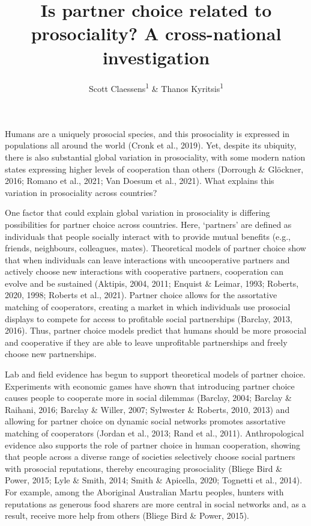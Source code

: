 \documentclass[
  man,floatsintext]{apa6}
\title{Is partner choice related to prosociality? A cross-national investigation}
\author{Scott Claessens\textsuperscript{1} \& Thanos Kyritsis\textsuperscript{1}}
\date{}
\affiliation{\vspace{0.5cm}\textsuperscript{1} School of Psychology, University of Auckland, Auckland, New Zealand}
\begin{document}
\maketitle

Humans are a uniquely prosocial species, and this prosociality is expressed in populations all around the world (Cronk et al., 2019). Yet, despite its ubiquity, there is also substantial global variation in prosociality, with some modern nation states expressing higher levels of cooperation than others (Dorrough \& Glöckner, 2016; Romano et al., 2021; Van Doesum et al., 2021). What explains this variation in prosociality across countries?

One factor that could explain global variation in prosociality is differing possibilities for partner choice across countries. Here, `partners' are defined as individuals that people socially interact with to provide mutual benefits (e.g., friends, neighbours, colleagues, mates). Theoretical models of partner choice show that when individuals can leave interactions with uncooperative partners and actively choose new interactions with cooperative partners, cooperation can evolve and be sustained (Aktipis, 2004, 2011; Enquist \& Leimar, 1993; Roberts, 2020, 1998; Roberts et al., 2021). Partner choice allows for the assortative matching of cooperators, creating a market in which individuals use prosocial displays to compete for access to profitable social partnerships (Barclay, 2013, 2016). Thus, partner choice models predict that humans should be more prosocial and cooperative if they are able to leave unprofitable partnerships and freely choose new partnerships.

Lab and field evidence has begun to support theoretical models of partner choice. Experiments with economic games have shown that introducing partner choice causes people to cooperate more in social dilemmas (Barclay, 2004; Barclay \& Raihani, 2016; Barclay \& Willer, 2007; Sylwester \& Roberts, 2010, 2013) and allowing for partner choice on dynamic social networks promotes assortative matching of cooperators (Jordan et al., 2013; Rand et al., 2011). Anthropological evidence also supports the role of partner choice in human cooperation, showing that people across a diverse range of societies selectively choose social partners with prosocial reputations, thereby encouraging prosociality (Bliege Bird \& Power, 2015; Lyle \& Smith, 2014; Smith \& Apicella, 2020; Tognetti et al., 2014). For example, among the Aboriginal Australian Martu peoples, hunters with reputations as generous food sharers are more central in social networks and, as a result, receive more help from others (Bliege Bird \& Power, 2015).
\end{document}

